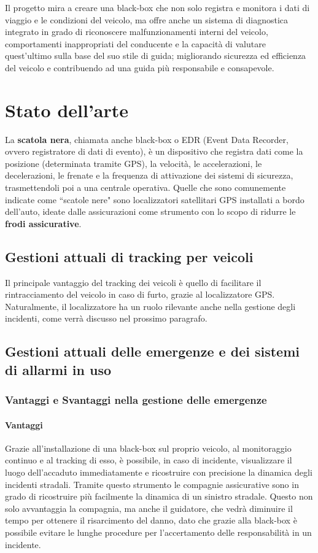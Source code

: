 \documentclass[12pt, a4paper, italian]{report}
\numberwithin{figure}{chapter}
\numberwithin{table}{chapter}
\begin{document}
\vspace{1cm}

Il progetto mira a creare una black-box che non solo registra e monitora i dati di viaggio e le condizioni del veicolo, ma offre anche un sistema di diagnostica integrato in grado di riconoscere malfunzionamenti interni del veicolo, comportamenti inappropriati del conducente e la capacità di valutare quest'ultimo sulla base del suo stile di guida; migliorando sicurezza ed efficienza del veicolo e contribuendo ad una guida più responsabile e consapevole.

\chapter{Stato dell'arte}
La \textbf{scatola nera}, chiamata anche black-box o EDR (Event Data Recorder, ovvero registratore di dati di evento), è un dispositivo che registra dati come la posizione (determinata tramite GPS), la velocità, le accelerazioni, le decelerazioni, le frenate e la frequenza di attivazione dei sistemi di sicurezza, trasmettendoli poi a una centrale operativa.
Quelle che sono comunemente indicate come ``scatole nere" sono localizzatori satellitari GPS installati a bordo dell'auto, ideate dalle assicurazioni come strumento con lo scopo di ridurre le \textbf{frodi assicurative}.
\section{Gestioni attuali di tracking per veicoli}
Il principale vantaggio del tracking dei veicoli è quello di facilitare il rintracciamento del veicolo in caso di furto, grazie al localizzatore GPS. Naturalmente, il localizzatore ha un ruolo rilevante anche nella gestione degli incidenti, come verrà discusso nel prossimo paragrafo.
\section{Gestioni attuali delle emergenze e dei sistemi di allarmi in uso}
\subsection{Vantaggi e Svantaggi nella gestione delle emergenze}
\subsubsection{Vantaggi}
Grazie all'installazione di una black-box sul proprio veicolo, al monitoraggio continuo e al tracking di esso, è possibile, in caso di incidente, visualizzare il luogo dell'accaduto immediatamente e ricostruire con precisione la dinamica degli incidenti stradali. Tramite questo strumento le compagnie assicurative sono in grado di ricostruire più facilmente la dinamica di un sinistro stradale. Questo non solo avvantaggia la compagnia, ma anche il guidatore, che vedrà diminuire il tempo
per ottenere il risarcimento del danno, dato che grazie alla black-box è possibile evitare le lunghe procedure per l'accertamento delle responsabilità in un incidente.
\end{document}
